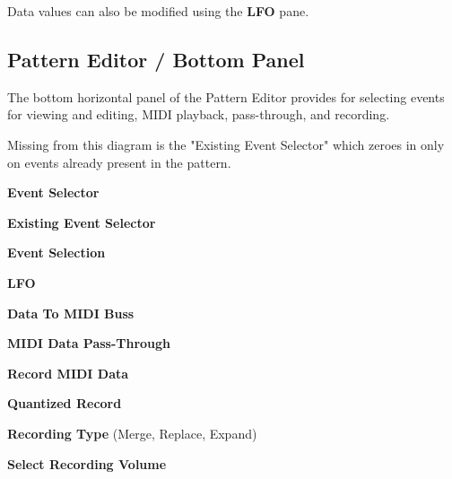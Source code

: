    Data values can also be modified using the \textbf{LFO} pane.

\subsection{Pattern Editor / Bottom Panel}
\label{subsec:pattern_editor_bottom}

   The bottom horizontal panel of the Pattern Editor provides for
   selecting events for viewing and editing, MIDI playback,
   pass-through, and recording.


   Missing from this diagram is the "Existing Event Selector" which zeroes
   in only on events already present in the pattern.

%

   \begin{enumber}
      \item \textbf{Event Selector}
      \item \textbf{Existing Event Selector}
      \item \textbf{Event Selection}
      \item \textbf{LFO}
      \item \textbf{Data To MIDI Buss}
      \item \textbf{MIDI Data Pass-Through}
      \item \textbf{Record MIDI Data}
      \item \textbf{Quantized Record}
      \item \textbf{Recording Type} (Merge, Replace, Expand)
      \item \textbf{Select Recording Volume}
   \end{enumber}

